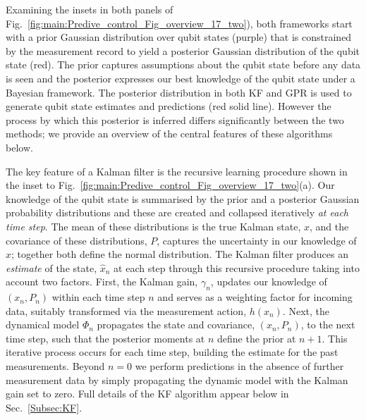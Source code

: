 \documentclass[pra, reprint]{revtex4-1}
\begin{document}
Examining the insets in both panels of Fig.~\ref{fig:main:Predive_control_Fig_overview_17_two}), both frameworks start with a prior Gaussian distribution over qubit states (purple) that is constrained by the measurement record to yield a posterior Gaussian distribution of the qubit state (red). The prior captures assumptions about the qubit state before any data is seen and the posterior expresses our best knowledge of the qubit state under a Bayesian framework.  The posterior distribution in both KF and GPR is used to generate qubit state estimates and predictions (red solid line).  However the process by which this posterior is inferred differs significantly between the two methods; we provide an overview of the central features of these algorithms below. 

The key feature of a Kalman filter is the recursive learning procedure shown in the inset to Fig.~\ref{fig:main:Predive_control_Fig_overview_17_two}(a). Our knowledge of the qubit state is summarised by the prior and a posterior Gaussian probability distributions and these are created and collapsed iteratively \emph{at each time step}. The mean of these distributions is the true Kalman state, $x$, and the covariance of these distributions, $P$, captures the uncertainty in our knowledge of $x$; together both define the normal distribution. The Kalman filter produces an \emph{estimate} of the state, $\hat{x}_{n}$ at each step through this recursive procedure taking into account two factors. First, the Kalman gain, $\gamma_n$, updates our knowledge of $(x_n, P_n)$ within each time step $n$ and serves as a weighting factor for incoming data, suitably transformed via the measurement action, $h(x_{n})$. Next, the dynamical model $\Phi_n$ propagates the state and covariance, $(x_n, P_n)$, to the next time step, such that the posterior moments at $n$ define the prior at $n+1$.  This iterative process occurs for each time step, building the estimate for the past measurements.  Beyond $n=0$ we perform predictions in the absence of further measurement data by simply propagating the dynamic model with the Kalman gain set to zero.  Full details of the KF algorithm appear below in Sec.~\ref{Subsec:KF}.
\end{document}
